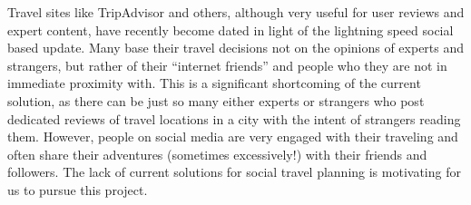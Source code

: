 Travel sites like TripAdvisor and others, although very useful for user reviews and expert content, have recently become dated in light of the lightning speed social based update. Many base their travel decisions not on the opinions of experts and strangers, but rather of their ``internet friends'' and people who they are not in immediate proximity with. This is a significant shortcoming of the current solution, as there can be just so many either experts or strangers who post dedicated reviews of travel locations in a city with the intent of strangers reading them. However, people on social media are very engaged with their traveling and often share their adventures (sometimes excessively!) with their friends and followers. The lack of current solutions for social travel planning is motivating for us to pursue this project.
